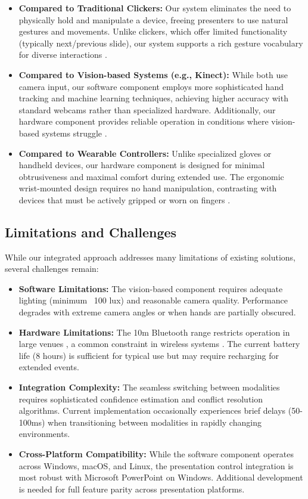\documentclass[arxiv,usenatbib]{iupartex}
\begin{document}
\begin{itemize}
  \item \textbf{Compared to Traditional Clickers:} Our system eliminates the need to physically hold and manipulate a device, freeing presenters to use natural gestures and movements. Unlike clickers, which offer limited functionality (typically next/previous slide), our system supports a rich gesture vocabulary for diverse interactions \cite{Johnson2018}.
  
  \item \textbf{Compared to Vision-based Systems (e.g., Kinect):} While both use camera input, our software component employs more sophisticated hand tracking and machine learning techniques, achieving higher accuracy with standard webcams rather than specialized hardware. Additionally, our hardware component provides reliable operation in conditions where vision-based systems struggle \cite{Lee2019, Chen2015}.
  
  \item \textbf{Compared to Wearable Controllers:} Unlike specialized gloves or handheld devices, our hardware component is designed for minimal obtrusiveness and maximal comfort during extended use. The ergonomic wrist-mounted design requires no hand manipulation, contrasting with devices that must be actively gripped or worn on fingers \cite{Wang2021}.
\end{itemize}

\subsection{Limitations and Challenges}
While our integrated approach addresses many limitations of existing solutions, several challenges remain:

\begin{itemize}
  \item \textbf{Software Limitations:} The vision-based component requires adequate lighting (minimum ~100 lux) and reasonable camera quality. Performance degrades with extreme camera angles or when hands are partially obscured.
  
  \item \textbf{Hardware Limitations:} The 10m Bluetooth range restricts operation in large venues \cite{Kim2020}, a common constraint in wireless systems \cite{Li2023}. The current battery life (8 hours) is sufficient for typical use but may require recharging for extended events.
  
  \item \textbf{Integration Complexity:} The seamless switching between modalities requires sophisticated confidence estimation and conflict resolution algorithms. Current implementation occasionally experiences brief delays (50-100ms) when transitioning between modalities in rapidly changing environments.
  
  \item \textbf{Cross-Platform Compatibility:} While the software component operates across Windows, macOS, and Linux, the presentation control integration is most robust with Microsoft PowerPoint on Windows. Additional development is needed for full feature parity across presentation platforms.
\end{itemize}
\end{document}
